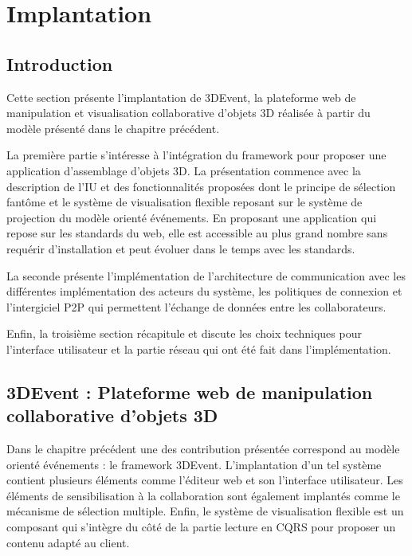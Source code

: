 
\chapter{Implantation}
\chaptertable

\section{Introduction} 
Cette section présente l'implantation de 3DEvent, la plateforme web de 
manipulation et visualisation collaborative d'objets 3D réalisée à partir du modèle 
présenté dans le chapitre précédent.

La première partie s'intéresse à l'intégration 
du framework pour proposer une application d'assemblage d'objets 3D. La 
présentation commence avec la description de l'\gls{IU} et des fonctionnalités 
proposées dont le principe de sélection fantôme et le système de visualisation 
flexible reposant sur le système de projection du modèle orienté événements. 
En proposant une application qui repose sur les standards du web, elle est 
accessible au plus grand nombre sans requérir d'installation et peut évoluer dans 
le temps avec les standards. 

La seconde présente l'implémentation de l'architecture de communication avec les 
différentes implémentation des acteurs du système, les politiques de connexion et 
l'intergiciel \gls{P2P} qui permettent l'échange de données entre les collaborateurs.

Enfin, la troisième section récapitule et discute les choix techniques pour 
l'interface utilisateur et la partie réseau qui ont été fait dans l'implémentation.


\section{3DEvent : Plateforme web de manipulation collaborative d'objets 3D}
Dans le chapitre précédent une des contribution présentée correspond au 
modèle orienté événements : le \gls{framework} 3DEvent. 
L'implantation d'un tel système contient plusieurs éléments comme l'éditeur 
web et son l'interface utilisateur. Les éléments de sensibilisation à la collaboration 
sont également implantés comme le mécanisme de sélection multiple. Enfin, le 
système de visualisation flexible est un composant qui s'intègre du côté de la 
partie lecture en \gls{CQRS} pour proposer un contenu adapté au client. 

